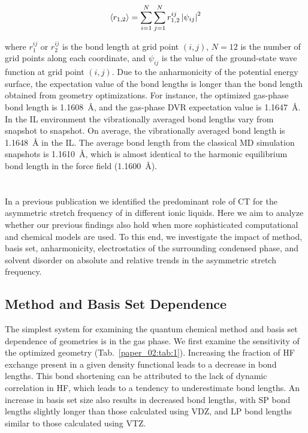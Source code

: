 \begin{equation}
  \label{paper_02:eq:3}
  \Braket{ r_{1,2} } = \sum_{i = 1}^{N} \sum_{j = 1}^{N} r_{1,2}^{ij}\left| \psi_{ij} \right|^{2}
\end{equation}

where \(r_{1}^{ij}\) or \(r_{2}^{ij}\) is the bond length at grid point \((i,j)\), \(N = 12\) is the number of grid points along each coordinate, and \(\psi_{ij}\) is the value of the ground-state wave function at grid point \((i,j)\). Due to the anharmonicity of the potential energy surface, the expectation value of the bond lengths is longer than the bond length obtained from geometry optimizations. For instance, the optimized gas-phase bond length is \SI{1.1608}{\angstrom}, and the gas-phase DVR expectation value is \SI{1.1647}{\angstrom}. In the IL environment the vibrationally averaged  bond lengths vary from snapshot to snapshot. On average, the vibrationally averaged  bond length is \SI{1.1648}{\angstrom} in the IL. The average bond length from the classical MD simulation snapshots is \SI{1.1610}{\angstrom}, which is almost identical to the harmonic equilibrium bond length in the force field (\SI{1.1600}{\angstrom}).

\section{}
\label{paper_02:sec:III}

In a previous publication\cite{Brinzer2015} we identified the predominant role of CT for the asymmetric stretch frequency of  in different ionic liquids. Here we aim to analyze whether our previous findings also hold when more sophisticated computational and chemical models are used. To this end, we investigate the impact of method, basis set, anharmonicity, electrostatics of the surrounding condensed phase, and solvent disorder on absolute and relative trends in the  asymmetric stretch frequency.

\subsection{Method and Basis Set Dependence}
\label{paper_02:ssec:IIIA}

The simplest system for examining the quantum chemical method and basis set dependence of geometries is  in the gas phase. We first examine the sensitivity of the optimized geometry (Tab.~\ref{paper_02:tab:1}). Increasing the fraction of HF exchange present in a given density functional leads to a decrease in bond lengths. This bond shortening can be attributed to the lack of dynamic correlation in HF, which leads to a tendency to underestimate bond lengths. An increase in basis set size also results in decreased bond lengths, with SP bond lengths slightly longer than those calculated using VDZ, and LP bond lengths similar to those calculated using VTZ.

